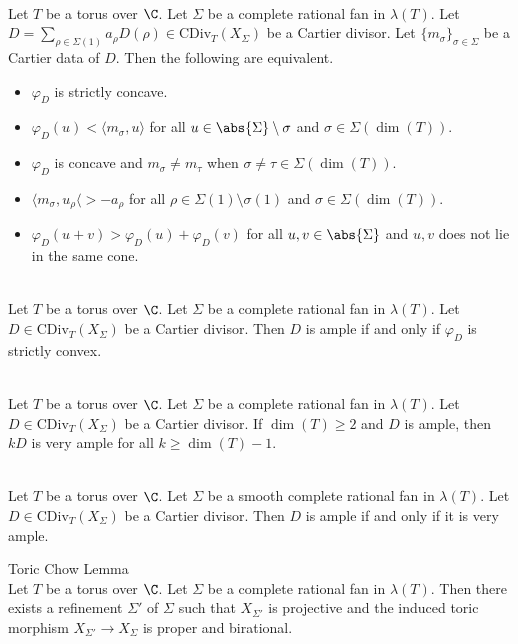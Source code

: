 \documentclass[a4paper]{article}
\begin{document}
\begin{lmm}{}{}\\
Let $T$ be a torus over $\C$. Let $\Sigma$ be a complete rational fan in $\lambda(T)$. Let $D=\sum_{\rho\in\Sigma(1)}a_\rho D(\rho)\in\text{CDiv}_T(X_\Sigma)$ be a Cartier divisor. Let $\{m_\sigma\}_{\sigma\in\Sigma}$ be a Cartier data of $D$. Then the following are equivalent. 
\begin{itemize}
\item $\varphi_D$ is strictly concave. 
\item $\varphi_D(u)<\langle m_\sigma,u\rangle$ for all $u\in\abs{\Sigma}\setminus\sigma$ and $\sigma\in\Sigma(\dim(T))$. 
\item $\varphi_D$ is concave and $m_\sigma\neq m_\tau$ when $\sigma\neq\tau\in\Sigma(\dim(T))$. 
\item $\langle m_\sigma,u_\rho\langle>-a_\rho$ for all $\rho\in\Sigma(1)\setminus\sigma(1)$ and $\sigma\in\Sigma(\dim(T))$. 
\item $\varphi_D(u+v)>\varphi_D(u)+\varphi_D(v)$ for all $u,v\in\abs{\Sigma}$ and $u,v$ does not lie in the same cone. 
\end{itemize}
\end{lmm}

\begin{prp}{}{}\\
Let $T$ be a torus over $\C$. Let $\Sigma$ be a complete rational fan in $\lambda(T)$. Let $D\in\text{CDiv}_T(X_\Sigma)$ be a Cartier divisor. Then $D$ is ample if and only if $\varphi_D$ is strictly convex. 
\end{prp}

\begin{prp}{}{}\\
Let $T$ be a torus over $\C$. Let $\Sigma$ be a complete rational fan in $\lambda(T)$. Let $D\in\text{CDiv}_T(X_\Sigma)$ be a Cartier divisor. If $\dim(T)\geq 2$ and $D$ is ample, then $kD$ is very ample for all $k\geq\dim(T)-1$. 
\end{prp}

\begin{prp}{}{}\\
Let $T$ be a torus over $\C$. Let $\Sigma$ be a smooth complete rational fan in $\lambda(T)$. Let $D\in\text{CDiv}_T(X_\Sigma)$ be a Cartier divisor. Then $D$ is ample if and only if it is very ample. 
\end{prp}

\begin{thm}{Toric Chow Lemma}{}\\
Let $T$ be a torus over $\C$. Let $\Sigma$ be a complete rational fan in $\lambda(T)$. Then there exists a refinement $\Sigma'$ of $\Sigma$ such that $X_{\Sigma'}$ is projective and the induced toric morphism $X_{\Sigma'}\to X_\Sigma$ is proper and birational. 
\end{thm}
\end{document}

